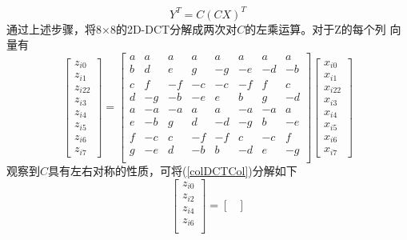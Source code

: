 \documentclass{article}
\numberwithin {equation}{section}
\begin{document}
\begin{spacing}{1.25}
\begin{equation}
        Y^{T}=C(CX)^{T} 
        \label{rowColDCT}
      \end{equation}
      通过上述步骤，将8×8的2D-DCT分解成两次对$C$的左乘运算。对于Z的每个列
      向量有
      \begin{equation}
        \begin{bmatrix}
          z_{i0}\\z_{i1}\\z_{i22}\\z_{i3}\\z_{i4}\\z_{i5}\\z_{i6}\\z_{i7}
        \end{bmatrix}=\begin{bmatrix}
          a & a   & a   & a   & a   & a   & a   & a\\
          b & d   & e   & g   & -g  & -e  & -d  & -b\\
          c & f   & -f  & -c  & -c  & -f  & f   & c\\
          d & -g  & -b  & -e  & e   & b   & g   & -d\\
          a & -a  & -a  & a   & a   & -a  & -a  & a\\
          e & -b  & g   & d   & -d  & -g  & b   & -e\\
          f & -c  & c   & -f  & -f  & c   & -c  & f\\
          g & -e  & d   & -b  & b   & -d  & e   & -g\\
        \end{bmatrix}\begin{bmatrix}
          x_{i0}\\x_{i1}\\x_{i22}\\x_{i3}\\x_{i4}\\x_{i5}\\x_{i6}\\x_{i7}
        \end{bmatrix}
        \label{colDCTCol}
      \end{equation}
      观察到$C$具有左右对称的性质，可将(\ref{colDCTCol})分解如下
      \begin{equation}
        \begin{bmatrix}
          z_{i0}\\z_{i2}\\z_{i4}\\z_{i6}\\
        \end{bmatrix}=\begin{bmatrix}

\end{bmatrix}
\end{equation}
\end{spacing}
\end{document}
